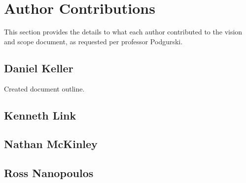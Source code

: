 \documentclass[letter]{scrartcl}
\begin{document}
\pagebreak
\section{Author Contributions}
This section provides the details to what each author contributed to the vision and scope document, as requested per professor Podgurski.
\subsection{Daniel Keller}
Created document outline.
\subsection{Kenneth Link}
\subsection{Nathan McKinley}
\subsection{Ross Nanopoulos}
\end{document}

